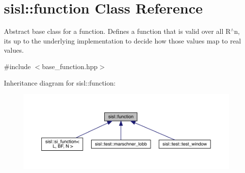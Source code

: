 \hypertarget{classsisl_1_1function}{}\section{sisl\+:\+:function Class Reference}
\label{classsisl_1_1function}


Abstract base class for a function. Defines a function that is valid over all R$^\wedge$n, it\textquotesingle{}s up to the underlying implementation to decide how those values map to real values.  




{\ttfamily \#include $<$base\+\_\+function.\+hpp$>$}



Inheritance diagram for sisl\+:\+:function\+:\nopagebreak
\begin{figure}[H]
\begin{center}
\leavevmode
\includegraphics[width=350pt]{classsisl_1_1function__inherit__graph}
\end{center}
\end{figure}
